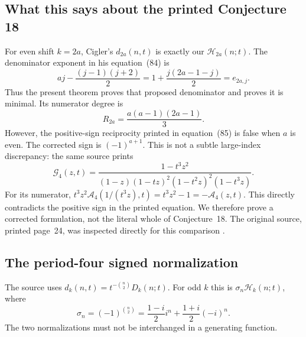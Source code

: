 \documentclass[11pt]{article}
\theoremstyle{definition}
\theoremstyle{remark}
\newcommand{\Ht}{\mathcal H}
\newcommand{\AN}{\mathscr A}
\newcommand{\GG}{\mathscr G}
\theoremstyle{definition}
\theoremstyle{plain}
\numberwithin{equation}{section}
\begin{document}
\subsection{What this says about the printed Conjecture 18}
For even shift $k=2a$, Cigler's $d_{2a}(n,t)$ is exactly our
$\Ht_{2a}(n;t)$. The denominator exponent in his equation~(84) is
\[
 aj-\frac{(j-1)(j+2)}2
 =1+\frac{j(2a-1-j)}2=e_{2a,j}.
\]
Thus the present theorem proves that proposed denominator and proves it is
minimal. Its numerator degree is
\[
 R_{2a}=\frac{a(a-1)(2a-1)}3.
\]
However, the positive-sign reciprocity printed in equation~(85) is false
when $a$ is even. The corrected sign is $(-1)^{a+1}$.
This is not a subtle large-index discrepancy: the same source prints
\begin{equation}
 \GG_4(z,t)=\frac{1-t^3z^2}
 {(1-z)(1-tz)^2(1-t^2z)^2(1-t^3z)}.
 \label{rs:eq:G4}
\end{equation}
For its numerator,
$t^3z^2\AN_4(1/(t^3z),t)=t^3z^2-1=-\AN_4(z,t)$.
This directly contradicts the positive sign in the printed equation.
We therefore prove a corrected formulation, not the literal whole of
Conjecture~18. The original source, printed page~24, was inspected directly
for this comparison \cite{Cigler}.

\subsection{The period-four signed normalization}
The source uses $d_k(n,t)=t^{-\binom n2}D_k(n;t)$. For odd $k$ this is
$\sigma_n\Ht_k(n;t)$, where
\begin{equation}
 \sigma_n=(-1)^{\binom n2}
 =\frac{1-i}{2}i^n+\frac{1+i}{2}(-i)^n.
 \label{rs:eq:sigma}
\end{equation}
The two normalizations must not be interchanged in a generating function.
\end{document}
